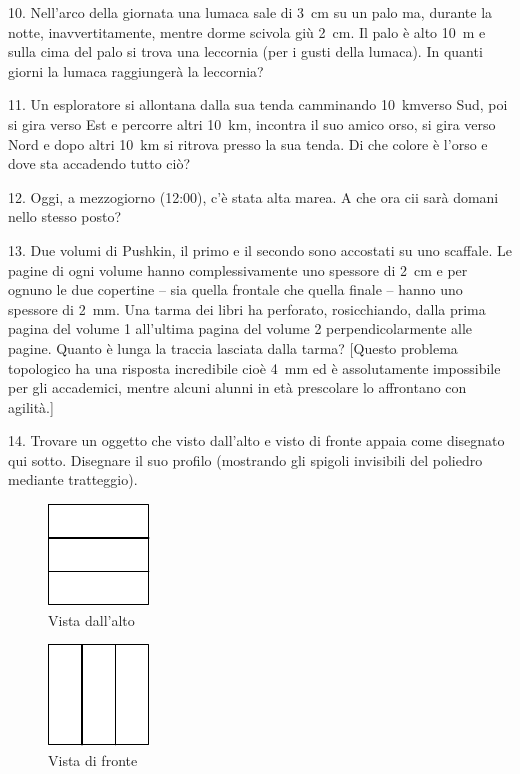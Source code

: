\begin{problem}{10.}
	Nell’arco della giornata una lumaca sale di \SI{3}{\cm} su un palo ma, durante la notte, inavvertitamente, mentre dorme scivola giù \SI{2}{\cm}. Il palo è alto \SI{10}{\metre} 
e sulla cima del palo si trova una leccornia (per i gusti della lumaca). In quanti giorni la lumaca raggiungerà la leccornia?
\end{problem}

\begin{problem}{11.}
	Un esploratore si allontana dalla sua tenda camminando \SI{10}{\km}verso Sud, poi si gira verso Est e percorre altri \SI{10}{\km},
	incontra il suo amico orso, si gira verso Nord e dopo altri \SI{10}{\km} si ritrova presso la sua tenda. Di che colore è l’orso e dove sta accadendo tutto ciò?
\end{problem}

\begin{problem}{12.}
	Oggi, a mezzogiorno (12:00), c’è stata alta marea. A che ora cii sarà domani nello stesso posto?
\end{problem}

\begin{problem}{13.}
	Due volumi di Pushkin, il primo e il secondo sono accostati su uno scaffale. Le pagine di ogni volume hanno complessivamente uno spessore di \SI{2}{\cm} e per ognuno le due copertine -- sia quella frontale che quella finale -- hanno uno spessore di  \SI{2}{\mm}. Una tarma dei libri ha perforato, rosicchiando, dalla prima pagina del volume 1 all’ultima pagina del volume 2 perpendicolarmente alle pagine. Quanto è lunga la traccia lasciata dalla tarma? [Questo problema topologico ha una risposta incredibile cioè \SI{4}{\mm} ed è assolutamente impossibile per gli accademici, mentre alcuni alunni in età prescolare lo affrontano con agilità.]
\end{problem}

\begin{problem}{14.}
	Trovare un oggetto che visto dall’alto e visto di fronte appaia come disegnato qui sotto. Disegnare il suo profilo (mostrando gli spigoli invisibili del poliedro mediante tratteggio).
	\begin{figure}
		\footnotesize
		\null\hfill
		\parbox{0.2\linewidth}{\centering\includegraphics{resources/taskbook-99}\\Vista dall'alto}
		\hfill
		\parbox{0.2\linewidth}{\centering\includegraphics{resources/taskbook-98}\\Vista di fronte}
		\hfill\null
	\end{figure}
\end{problem}

